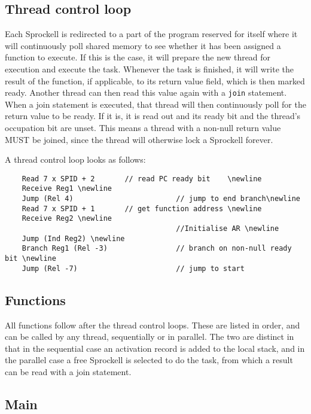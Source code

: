 \documentclass[10pt,a4paper]{report}
\begin{document}
\subsection{Thread control loop}
Each Sprockell is redirected to a part of the program reserved for itself where it will continuously poll shared memory to see whether it has been assigned a function to execute. If this is the case, it will prepare the new thread for execution and execute the task. Whenever the task is finished, it will write the result of the function, if applicable, to its return value field, which is then marked ready. Another thread can then read this value again with a \texttt{join} statement. When a join statement is executed, that thread will then continuously poll for the return value to be ready. If it is, it is read out and its ready bit and the thread's occupation bit are unset. This means a thread with a non-null return value MUST be joined, since the thread will otherwise lock a Sprockell forever. 

A thread control loop looks as follows:
\begin{verbatim}
	Read 7 x SPID + 2		// read PC ready bit 	\newline
	Receive Reg1 \newline
	Jump (Rel 4)						// jump to end branch\newline
	Read 7 x SPID + 1		// get function address \newline
	Receive Reg2 \newline
										//Initialise AR \newline
	Jump (Ind Reg2) \newline
	Branch Reg1 (Rel -3)				// branch on non-null ready bit \newline
	Jump (Rel -7)						// jump to start
\end{verbatim}


\subsection{Functions}
All functions follow after the thread control loops. These are listed in order, and can be called by any thread, sequentially or in parallel. The two are distinct in that in the sequential case an activation record is added to the local stack, and in the parallel case a free Sprockell is selected to do the task, from which a result can be read with a join statement.

\subsection{Main}
\end{document}
